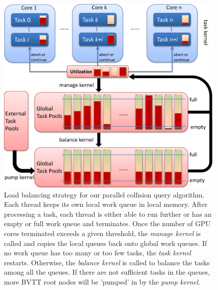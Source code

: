 \begin{figure}[!htb]
  \centering
  \includegraphics[width=\linewidth]{figs/5/balance.pdf}
  \caption[Load balancing strategy for our parallel collision query algorithm]{Load balancing strategy for our parallel collision query algorithm. Each thread keeps its own local work queue in local memory. After processing a task, each thread is either able to run further or has an empty or full work queue and terminates. Once the number of GPU cores terminated exceeds a given threshold, the \emph{manage kernel} is called and copies the local queues back onto global work queues. If no work queue has too many or too few tasks, the \emph{task kernel} restarts. Otherwise, the \emph{balance kernel} is called to balance the tasks among all the queues. If there are not sufficient tasks in the queues, more BVTT root nodes will be 'pumped' in by the \emph{pump kernel}.}
  \label{fig:5:balance}
\end{figure}

